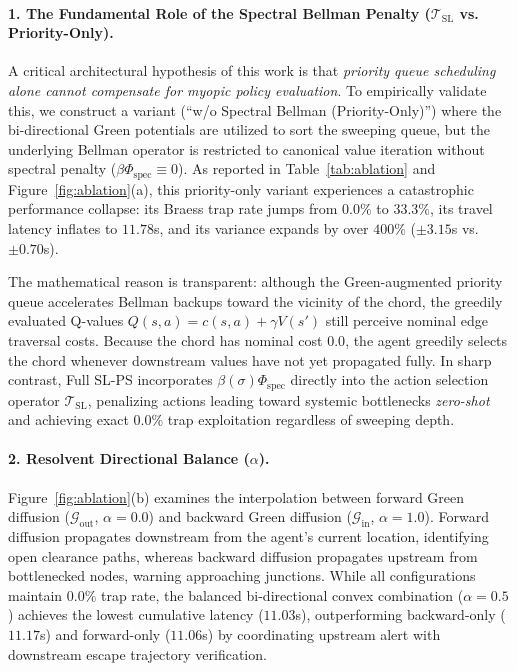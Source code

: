 \documentclass[11pt,a4paper]{article}
\begin{document}
\paragraph{1. The Fundamental Role of the Spectral Bellman Penalty ($\mathcal{T}_{\text{SL}}$ vs. Priority-Only).}
A critical architectural hypothesis of this work is that \textit{priority queue scheduling alone cannot compensate for myopic policy evaluation}. To empirically validate this, we construct a variant (``w/o Spectral Bellman (Priority-Only)'') where the bi-directional Green potentials are utilized to sort the sweeping queue, but the underlying Bellman operator is restricted to canonical value iteration without spectral penalty ($\beta \Phi_{\text{spec}} \equiv 0$). As reported in Table~\ref{tab:ablation} and Figure~\ref{fig:ablation}(a), this priority-only variant experiences a catastrophic performance collapse: its Braess trap rate jumps from $0.0\%$ to $33.3\%$, its travel latency inflates to $11.78$s, and its variance expands by over $400\%$ ($\pm 3.15$s vs. $\pm 0.70$s). 

The mathematical reason is transparent: although the Green-augmented priority queue accelerates Bellman backups toward the vicinity of the chord, the greedily evaluated Q-values $Q(s, a) = c(s, a) + \gamma V(s')$ still perceive nominal edge traversal costs. Because the chord has nominal cost $0.0$, the agent greedily selects the chord whenever downstream values have not yet propagated fully. In sharp contrast, Full SL-PS incorporates $\beta(\sigma) \Phi_{\text{spec}}$ directly into the action selection operator $\mathcal{T}_{\text{SL}}$, penalizing actions leading toward systemic bottlenecks \textit{zero-shot} and achieving exact $0.0\%$ trap exploitation regardless of sweeping depth.

\paragraph{2. Resolvent Directional Balance ($\alpha$).}
Figure~\ref{fig:ablation}(b) examines the interpolation between forward Green diffusion ($\mathcal{G}_{\text{out}}$, $\alpha = 0.0$) and backward Green diffusion ($\mathcal{G}_{\text{in}}$, $\alpha = 1.0$). Forward diffusion propagates downstream from the agent's current location, identifying open clearance paths, whereas backward diffusion propagates upstream from bottlenecked nodes, warning approaching junctions. While all configurations maintain $0.0\%$ trap rate, the balanced bi-directional convex combination ($\alpha = 0.5$) achieves the lowest cumulative latency ($11.03$s), outperforming backward-only ($11.17$s) and forward-only ($11.06$s) by coordinating upstream alert with downstream escape trajectory verification.
\end{document}
